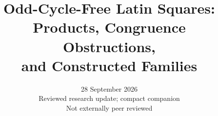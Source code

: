 \documentclass[11pt]{article}
\title{Odd-Cycle-Free Latin Squares:\\
Products, Congruence Obstructions,\\
and Constructed Families}
\author{}
\date{28 September 2026\\\small Reviewed research update; compact companion\\Not externally peer reviewed}
\begin{document}
\maketitle


















\footnotesize


\end{document}
